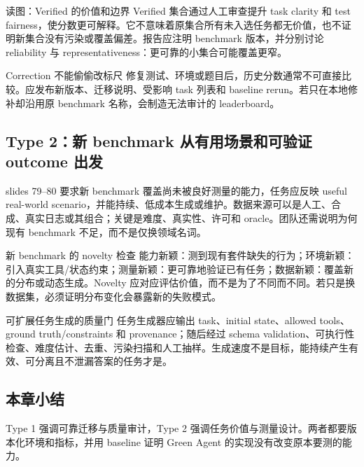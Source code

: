 \begin{knowledgebox}{读图：Verified 的价值和边界}
Verified 集合通过人工审查提升 task clarity 和 test fairness，使分数更可解释。它不意味着原集合所有未入选任务都无价值，也不证明新集合没有污染或覆盖偏差。报告应注明 benchmark 版本，并分别讨论 reliability 与 representativeness：更可靠的小集合可能覆盖更窄。
\end{knowledgebox}

\begin{warningbox}{Correction 不能偷偷改标尺}
修复测试、环境或题目后，历史分数通常不可直接比较。应发布新版本、迁移说明、受影响 task 列表和 baseline rerun。若只在本地修补却沿用原 benchmark 名称，会制造无法审计的 leaderboard。
\end{warningbox}

\subsection{Type 2：新 benchmark 从有用场景和可验证 outcome 出发}

slides 79--80 要求新 benchmark 覆盖尚未被良好测量的能力，任务应反映 useful real-world scenario，并能持续、低成本生成或维护。数据来源可以是人工、合成、真实日志或其组合；关键是难度、真实性、许可和 oracle。团队还需说明为何现有 benchmark 不足，而不是仅换领域名词。


\begin{knowledgebox}{新 benchmark 的 novelty 检查}
能力新颖：测到现有套件缺失的行为；环境新颖：引入真实工具/状态约束；测量新颖：更可靠地验证已有任务；数据新颖：覆盖新的分布或动态生成。Novelty 应对应评估价值，而不是为了不同而不同。若只是换数据集，必须证明分布变化会暴露新的失败模式。
\end{knowledgebox}

\begin{importantbox}{可扩展任务生成的质量门}
任务生成器应输出 task、initial state、allowed tools、ground truth/constraints 和 provenance；随后经过 schema validation、可执行性检查、难度估计、去重、污染扫描和人工抽样。生成速度不是目标，能持续产生有效、可分离且不泄漏答案的任务才是。
\end{importantbox}

\subsection{本章小结}

Type 1 强调可靠迁移与质量审计，Type 2 强调任务价值与测量设计。两者都要版本化环境和指标，并用 baseline 证明 Green Agent 的实现没有改变原本要测的能力。

